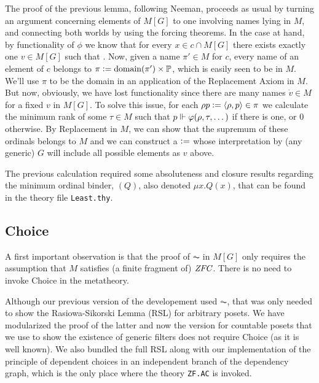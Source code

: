 The proof of the previous lemma, following Neeman, proceeds as usual
by turning an argument concerning elements of $M[G]$ to one involving
names lying in $M$, and connecting both worlds by using the forcing
theorems. In the case at hand, by functionality of $\phi$ we know that
for every $x\in c\cap M[G]$ there exists exactly one $v\in M[G]$ such
that
. Now,
given a name $\pi'\in M$ for $c$, every name of an element of $c$
belongs to $\pi\mathrel{\mathop:}= \operatorname{domain}(\pi')\times \mathbb{P}$, which is easily seen to be
in $M$. We'll use $\pi$ to be the domain in an application of the
Replacement Axiom in $M$. But now, obviously, we have lost
functionality since there are many names $\dot v\in M$ for a fixed $v$
in $M[G]$. To solve this issue, for each $\rho p \mathrel{\mathop:}=\langle\rho,p\rangle\in
\pi$ we calculate the
minimum rank of some $\tau\in M$ such that 
$p\Vdash \varphi(\rho,\tau,\dots)$ if there is one, or $0$ otherwise. By
Replacement in $M$, we can show that the supremum  of these ordinals
belongs to $M$ and we can construct a  $\mathrel{\mathop:}=$ 
whose interpretation by (any generic) $G$ will include all possible elements
as $v$ above.

The previous calculation required some absoluteness and closure
results regarding the minimum ordinal binder, $(Q)$, also
denoted $\mu x. Q(x)$, that can be found in the theory file
\texttt{Least.thy}.

\subsection{Choice}
A first important observation is that the proof of $\AC$ in $M[G]$
only requires the assumption that $M$ satisfies (a finite fragment of)
$\mathit{ZFC}$. There is no need to invoke Choice in the metatheory.

Although our previous version of the developement used $\AC$, that was
only needed to show the Rasiowa-Sikorski Lemma (RSL) for
arbitrary posets. We have modularized the proof of the latter
and now the version for countable posets that we use to show the
existence of generic filters
does not require Choice (as it is well known). We also bundled the
full RSL along with our implementation of the principle of dependent
choices in an independent branch of the dependency graph, which is the
only place where the theory \texttt{ZF.AC} is invoked.

